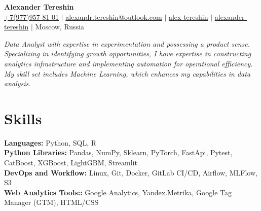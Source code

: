 \documentclass[letterpaper,11pt]{article}
\newcommand{\resumeSubHeadingListStart}{\begin{itemize}[leftmargin=0.15in, label={}]}
\newcommand{\resumeSubHeadingListEnd}{\end{itemize}}
\begin{document}

\begin{center}
    \textbf{\Huge Alexander Tereshin} \\ \vspace{8pt}
    \small
    \faMobile \hspace{.5pt} \href{tel:+7(977)957-81-01}{+7(977)957-81-01}
    $|$
    \faAt \hspace{.5pt} \href{mailto:alexandr.tereshin@outlook.com}{alexandr.tereshin@outlook.com}
    $|$
    \faLinkedinSquare \hspace{.5pt} \href{https://www.linkedin.com/in/alex-tereshin}{alex-tereshin}
    $|$
    \faGithub \hspace{.5pt} \href{https://github.com/alexander-tereshin}{alexander-tereshin}
    $|$
    \faMapMarker \hspace{.5pt} Moscow, Russia
\end{center}



\vspace{-4pt}
\textit
{Data Analyst with expertise in experimentation and possessing a product sense. 
Specializing in identifying growth opportunities, I have expertise in constructing analytics infrastructure and implementing automation for operational efficiency. 
My skill set includes Machine Learning, which enhances my capabilities in data analysis.}


\section{Skills}
  \vspace{2pt}
  \resumeSubHeadingListStart
    \small{\item{
        \textbf{Languages:}{ Python, SQL, R} \\ \vspace*{3pt}
        \textbf{Python Libraries:}{ Pandas, NumPy, Sklearn, PyTorch, FastApi, Pytest, CatBoost, XGBoost, LightGBM, Streamlit} \\ \vspace*{3pt}
        \textbf{DevOps and Workflow:}{ Linux, Git, Docker, GitLab CI/CD, Airflow, MLFlow, S3} \\ \vspace*{3pt}
        \textbf{Web Analytics Tools::}{ Google Analytics, Yandex.Metrika, Google Tag Manager (GTM), HTML/CSS} \\ \vspace*{3pt}
    }}
  \resumeSubHeadingListEnd
\end{document}

